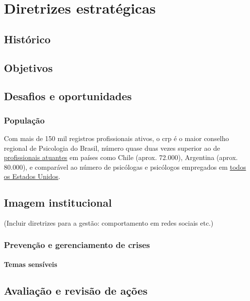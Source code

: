 \chapter{Diretrizes estratégicas}

\section{Histórico}

\section{Objetivos}

\section{Desafios e oportunidades}

\subsection{População}

Com mais de 150 mil registros profissionais ativos, o \ac{crp} é o maior conselho regional de Psicologia do Brasil, número quase duas vezes superior ao de \href{https://www.who.int/publications/i/item/9789240036703/}{profissionais atuantes} em países como Chile (aprox. 72.000), Argentina (aprox. 80.000), e comparável ao número de psicólogas e psicólogos  empregados em \href{https://www.bls.gov/ooh/life-physical-and-social-science/psychologists.htm\#tab-7}{todos os Estados Unidos}.
%

\section{Imagem institucional}

(Incluir diretrizes para a gestão: comportamento em redes sociais etc.)

\subsection{Prevenção e gerenciamento de crises}

\subsubsection{Temas sensíveis}

\section{Avaliação e revisão de ações}